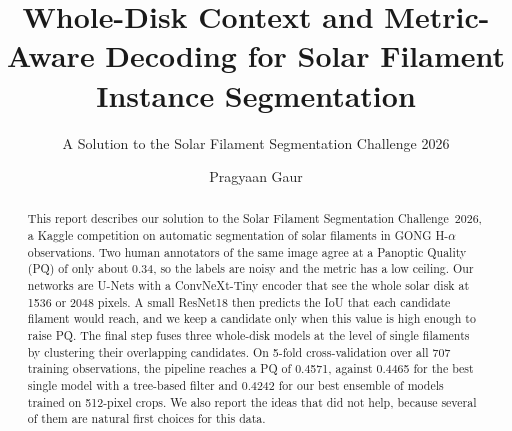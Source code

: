 \documentclass[sigconf]{acmart}
\begin{document}
\title{Whole-Disk Context and Metric-Aware Decoding for Solar Filament Instance Segmentation}
\subtitle{A Solution to the Solar Filament Segmentation Challenge 2026} %


\author{Pragyaan Gaur}

\begin{abstract}
    This report describes our solution to the Solar Filament Segmentation Challenge~2026, a Kaggle competition on automatic segmentation of solar filaments in GONG H-$\alpha$ observations. Two human annotators of the same image agree at a Panoptic Quality (PQ) of only about 0.34, so the labels are noisy and the metric has a low ceiling. Our networks are U-Nets with a ConvNeXt-Tiny encoder that see the whole solar disk at 1536 or 2048 pixels. A small ResNet18 then predicts the IoU that each candidate filament would reach, and we keep a candidate only when this value is high enough to raise PQ. The final step fuses three whole-disk models at the level of single filaments by clustering their overlapping candidates. On 5-fold cross-validation over all 707 training observations, the pipeline reaches a PQ of 0.4571, against 0.4465 for the best single model with a tree-based filter and 0.4242 for our best ensemble of models trained on 512-pixel crops. We also report the ideas that did not help, because several of them are natural first choices for this data.
\end{abstract}

\maketitle

\ifguideStyle
{}
\par\medskip
\fi

\end{document}
